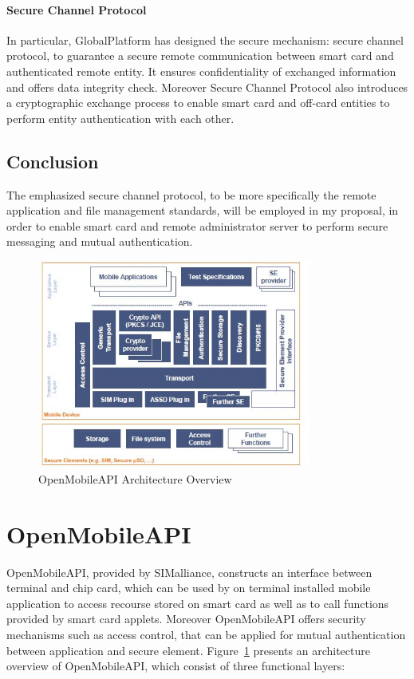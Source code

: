 \paragraph{Secure Channel Protocol}
In particular, GlobalPlatform has designed the secure mechanism: secure channel protocol, to guarantee a secure remote communication between smart card and authenticated remote entity. It ensures confidentiality of exchanged information and offers data integrity check.  Moreover Secure Channel Protocol also introduces  a cryptographic exchange process to enable smart card and off-card entities to perform entity authentication with each other. 


\subsection{Conclusion}
The emphasized secure channel protocol, to be more specifically the remote application and file management standards, will be employed in my proposal, in order to enable smart card and remote administrator server to perform secure messaging and mutual authentication.
 \begin{figure}[!htbp]
	\centering
	\includegraphics[width=0.8\textwidth]{open-architecture.jpg}
		\caption{OpenMobileAPI Architecture Overview \cite{open}}
	\label{fig:open-architecture}
\end{figure}
\section{OpenMobileAPI} \label{secOMA}
OpenMobileAPI, provided by SIMalliance, constructs an interface between terminal and chip card, which can be used by on terminal installed mobile application to access recourse stored on smart card as well as to call functions provided by smart card applets. Moreover OpenMobileAPI offers security mechanisms such as access control, that can be applied for mutual authentication between application and secure element. Figure~\ref{fig:open-architecture} presents an architecture overview of OpenMobileAPI, which consist of three functional layers:

